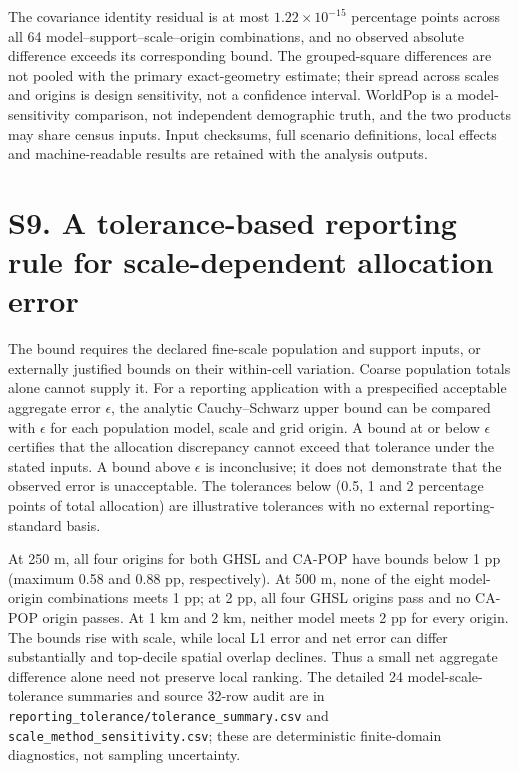 \documentclass[10pt,a4paper]{article}
\begin{document}
The covariance identity residual is at most $1.22\times10^{-15}$ percentage points across all 64 model--support--scale--origin combinations, and no observed absolute difference exceeds its corresponding bound. The grouped-square differences are not pooled with the primary exact-geometry estimate; their spread across scales and origins is design sensitivity, not a confidence interval. WorldPop is a model-sensitivity comparison, not independent demographic truth, and the two products may share census inputs. Input checksums, full scenario definitions, local effects and machine-readable results are retained with the analysis outputs.



\section*{S9. A tolerance-based reporting rule for scale-dependent allocation error}

The bound requires the declared fine-scale population and support inputs, or externally justified bounds on their within-cell variation. Coarse population totals alone cannot supply it. For a reporting application with a prespecified acceptable aggregate error $\epsilon$, the analytic Cauchy--Schwarz upper bound can be compared with $\epsilon$ for each population model, scale and grid origin. A bound at or below $\epsilon$ certifies that the allocation discrepancy cannot exceed that tolerance under the stated inputs. A bound above $\epsilon$ is inconclusive; it does not demonstrate that the observed error is unacceptable. The tolerances below (0.5, 1 and 2 percentage points of total allocation) are illustrative tolerances with no external reporting-standard basis.

At 250 m, all four origins for both GHSL and CA-POP have bounds below 1 pp (maximum 0.58 and 0.88 pp, respectively). At 500 m, none of the eight model-origin combinations meets 1 pp; at 2 pp, all four GHSL origins pass and no CA-POP origin passes. At 1 km and 2 km, neither model meets 2 pp for every origin. The bounds rise with scale, while local L1 error and net error can differ substantially and top-decile spatial overlap declines. Thus a small net aggregate difference alone need not preserve local ranking. The detailed 24 model-scale-tolerance summaries and source 32-row audit are in \texttt{reporting\_tolerance/tolerance\_summary.csv} and \texttt{scale\_method\_sensitivity.csv}; these are deterministic finite-domain diagnostics, not sampling uncertainty.
\end{document}
